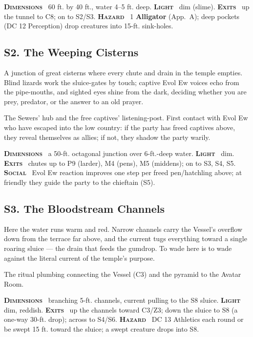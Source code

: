 \documentclass[10pt,twoside]{article}
\newcommand{\tech}[1]{\textbf{\scshape\textcolor{stone}{#1}}\ }
\begin{document}
\begin{techbox}
\tech{Dimensions} 60 ft. by 40 ft., water 4--5 ft. deep. \tech{Light} dim (slime).
\tech{Exits} up the tunnel to C8; on to S2/S3. \tech{Hazard} 1 \textbf{Alligator}
(App.\ A); deep pockets (DC 12 Perception) drop creatures into 15-ft. sink-holes.
\end{techbox}

\subsection{S2. The Weeping Cisterns}
\begin{readaloud}
A junction of great cisterns where every chute and drain in the temple empties. Blind
lizards work the sluice-gates by touch; captive Evol Ew voices echo from the
pipe-mouths, and sighted eyes shine from the dark, deciding whether you are prey,
predator, or the answer to an old prayer.
\end{readaloud}
The Sewers' hub and the free captives' listening-post. First contact with Evol Ew who
have escaped into the low country: if the party has freed captives above, they reveal
themselves as allies; if not, they shadow the party warily.

\begin{techbox}
\tech{Dimensions} a 50-ft. octagonal junction over 6-ft.-deep water. \tech{Light} dim.
\tech{Exits} chutes up to P9 (larder), M4 (pens), M5 (middens); on to S3, S4, S5.
\tech{Social} Evol Ew reaction improves one step per freed pen/hatchling above; at
friendly they guide the party to the chieftain (S5).
\end{techbox}

\subsection{S3. The Bloodstream Channels}
\begin{readaloud}
Here the water runs warm and red. Narrow channels carry the Vessel's overflow down
from the terrace far above, and the current tugs everything toward a single roaring
sluice --- the drain that feeds the gumdrop. To wade here is to wade against the
literal current of the temple's purpose.
\end{readaloud}
The ritual plumbing connecting the Vessel (C3) and the pyramid to the Avatar Room.

\begin{techbox}
\tech{Dimensions} branching 5-ft. channels, current pulling to the S8 sluice.
\tech{Light} dim, reddish. \tech{Exits} up the channels toward C3/Z3; down the sluice
to S8 (a one-way 30-ft. drop); across to S4/S6. \tech{Hazard} DC 13 Athletics each
round or be swept 15 ft. toward the sluice; a swept creature drops into S8.
\end{techbox}
\end{document}
